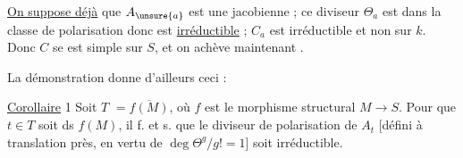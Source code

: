 
  \uline{On suppose déjà} que $A_{\unsure{a}}$ est une jacobienne  ;  ce diviseur $\Theta_a$ est dans la classe de polarisation donc est \uline{irréductible} ;  $C_a$ est irréductible et non  sur $k$. Donc $C$ se  est simple sur $S$, et on achève maintenant .

La démonstration donne d'ailleurs ceci :

 \uline{Corollaire} 1 Soit $T$  $=\overline{f(M)}$, où $f$ est le morphisme structural $M\to S$. Pour que $t\in T$ soit ds $f(M)$, il f. et s. que le diviseur de polarisation de $A_t$ [défini à translation près, en vertu de $\deg\Theta^g/g!=1$] soit  irréductible. 

